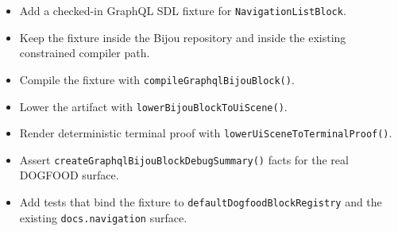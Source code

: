 \begin{itemize}
\tightlist
\item
  Add a checked-in GraphQL SDL fixture for \texttt{N\allowbreak{}a\allowbreak{}v\allowbreak{}i\allowbreak{}g\allowbreak{}a\allowbreak{}t\allowbreak{}i\allowbreak{}o\allowbreak{}n\allowbreak{}L\allowbreak{}i\allowbreak{}s\allowbreak{}t\allowbreak{}B\allowbreak{}l\allowbreak{}o\allowbreak{}c\allowbreak{}k}.
\item
  Keep the fixture inside the Bijou repository and inside the existing constrained compiler path.
\item
  Compile the fixture with \texttt{c\allowbreak{}o\allowbreak{}m\allowbreak{}p\allowbreak{}i\allowbreak{}l\allowbreak{}e\allowbreak{}G\allowbreak{}r\allowbreak{}a\allowbreak{}p\allowbreak{}h\allowbreak{}q\allowbreak{}l\allowbreak{}B\allowbreak{}i\allowbreak{}j\allowbreak{}o\allowbreak{}u\allowbreak{}B\allowbreak{}l\allowbreak{}o\allowbreak{}c\allowbreak{}k\allowbreak{}(\allowbreak{})}.
\item
  Lower the artifact with \texttt{l\allowbreak{}o\allowbreak{}w\allowbreak{}e\allowbreak{}r\allowbreak{}B\allowbreak{}i\allowbreak{}j\allowbreak{}o\allowbreak{}u\allowbreak{}B\allowbreak{}l\allowbreak{}o\allowbreak{}c\allowbreak{}k\allowbreak{}T\allowbreak{}o\allowbreak{}U\allowbreak{}i\allowbreak{}S\allowbreak{}c\allowbreak{}e\allowbreak{}n\allowbreak{}e\allowbreak{}(\allowbreak{})}.
\item
  Render deterministic terminal proof with \texttt{l\allowbreak{}o\allowbreak{}w\allowbreak{}e\allowbreak{}r\allowbreak{}U\allowbreak{}i\allowbreak{}S\allowbreak{}c\allowbreak{}e\allowbreak{}n\allowbreak{}e\allowbreak{}T\allowbreak{}o\allowbreak{}T\allowbreak{}e\allowbreak{}r\allowbreak{}m\allowbreak{}i\allowbreak{}n\allowbreak{}a\allowbreak{}l\allowbreak{}P\allowbreak{}r\allowbreak{}o\allowbreak{}o\allowbreak{}f\allowbreak{}(\allowbreak{})}.
\item
  Assert \texttt{c\allowbreak{}r\allowbreak{}e\allowbreak{}a\allowbreak{}t\allowbreak{}e\allowbreak{}G\allowbreak{}r\allowbreak{}a\allowbreak{}p\allowbreak{}h\allowbreak{}q\allowbreak{}l\allowbreak{}B\allowbreak{}i\allowbreak{}j\allowbreak{}o\allowbreak{}u\allowbreak{}B\allowbreak{}l\allowbreak{}o\allowbreak{}c\allowbreak{}k\allowbreak{}D\allowbreak{}e\allowbreak{}b\allowbreak{}u\allowbreak{}g\allowbreak{}S\allowbreak{}u\allowbreak{}m\allowbreak{}m\allowbreak{}a\allowbreak{}r\allowbreak{}y\allowbreak{}(\allowbreak{})} facts for the real DOGFOOD surface.
\item
  Add tests that bind the fixture to \texttt{d\allowbreak{}e\allowbreak{}f\allowbreak{}a\allowbreak{}u\allowbreak{}l\allowbreak{}t\allowbreak{}D\allowbreak{}o\allowbreak{}g\allowbreak{}f\allowbreak{}o\allowbreak{}o\allowbreak{}d\allowbreak{}B\allowbreak{}l\allowbreak{}o\allowbreak{}c\allowbreak{}k\allowbreak{}R\allowbreak{}e\allowbreak{}g\allowbreak{}i\allowbreak{}s\allowbreak{}t\allowbreak{}r\allowbreak{}y} and the existing \texttt{d\allowbreak{}o\allowbreak{}c\allowbreak{}s\allowbreak{}.\allowbreak{}n\allowbreak{}a\allowbreak{}v\allowbreak{}i\allowbreak{}g\allowbreak{}a\allowbreak{}t\allowbreak{}i\allowbreak{}o\allowbreak{}n} surface.

\end{itemize}

